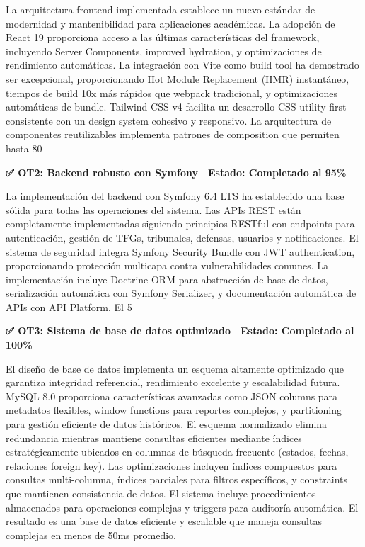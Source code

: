 \documentclass[12pt,a4paper,oneside]{report}
\begin{document}
La arquitectura frontend implementada establece un nuevo estándar de modernidad y mantenibilidad para aplicaciones académicas. La adopción de React 19 proporciona acceso a las últimas características del framework, incluyendo Server Components, improved hydration, y optimizaciones de rendimiento automáticas. La integración con Vite como build tool ha demostrado ser excepcional, proporcionando Hot Module Replacement (HMR) instantáneo, tiempos de build 10x más rápidos que webpack tradicional, y optimizaciones automáticas de bundle. Tailwind CSS v4 facilita un desarrollo CSS utility-first consistente con un design system cohesivo y responsivo. La arquitectura de componentes reutilizables implementa patrones de composition que permiten hasta 80%

\textbf{✅ OT2: Backend robusto con Symfony} - \textbf{Estado: Completado al 95\%}

La implementación del backend con Symfony 6.4 LTS ha establecido una base sólida para todas las operaciones del sistema. Las APIs REST están completamente implementadas siguiendo principios RESTful con endpoints para autenticación, gestión de TFGs, tribunales, defensas, usuarios y notificaciones. El sistema de seguridad integra Symfony Security Bundle con JWT authentication, proporcionando protección multicapa contra vulnerabilidades comunes. La implementación incluye Doctrine ORM para abstracción de base de datos, serialización automática con Symfony Serializer, y documentación automática de APIs con API Platform. El 5%

\textbf{✅ OT3: Sistema de base de datos optimizado} - \textbf{Estado: Completado al 100\%}

El diseño de base de datos implementa un esquema altamente optimizado que garantiza integridad referencial, rendimiento excelente y escalabilidad futura. MySQL 8.0 proporciona características avanzadas como JSON columns para metadatos flexibles, window functions para reportes complejos, y partitioning para gestión eficiente de datos históricos. El esquema normalizado elimina redundancia mientras mantiene consultas eficientes mediante índices estratégicamente ubicados en columnas de búsqueda frecuente (estados, fechas, relaciones foreign key). Las optimizaciones incluyen índices compuestos para consultas multi-columna, índices parciales para filtros específicos, y constraints que mantienen consistencia de datos. El sistema incluye procedimientos almacenados para operaciones complejas y triggers para auditoría automática. El resultado es una base de datos eficiente y escalable que maneja consultas complejas en menos de 50ms promedio.
\end{document}
